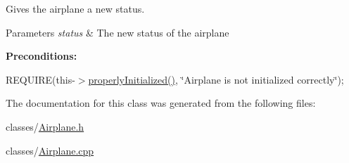Gives the airplane a new status. 


\begin{DoxyParams}{Parameters}
{\em status} & The new status of the airplane\\
\hline
\end{DoxyParams}
{\bfseries Preconditions\+:}
\begin{DoxyItemize}
\item R\+E\+Q\+U\+I\+RE(this-\/$>$\mbox{\hyperlink{class_airplane_a6f80df8f692cc8d67d292c1e9f26d59e}{properly\+Initialized()}}, \char`\"{}\+Airplane is not initialized correctly\char`\"{}); 
\end{DoxyItemize}

The documentation for this class was generated from the following files\+:\begin{DoxyCompactItemize}
\item 
classes/\mbox{\hyperlink{_airplane_8h}{Airplane.\+h}}\item 
classes/\mbox{\hyperlink{_airplane_8cpp}{Airplane.\+cpp}}\end{DoxyCompactItemize}
